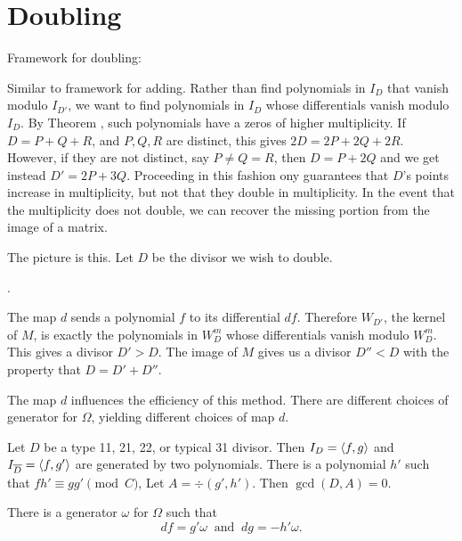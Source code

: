 
\section{Doubling}
\label{chap_doubling}

Framework for doubling:

Similar to framework for adding.
Rather than find polynomials in $I_D$ that vanish modulo $I_{D'}$,
we want to find polynomials in $I_D$ whose differentials vanish modulo $I_D$.
By Theorem , such polynomials have a zeros
of higher multiplicity.
If $D = P + Q + R$, and $P,Q,R$ are distinct, this gives $2D = 2P + 2Q + 2R$.
However, if they are not distinct,
say $P \neq Q = R$, then $D = P + 2Q$ and we get instead $D' = 2P + 3Q$.
Proceeding in this fashion ony guarantees that $D$'s points increase in multiplicity,
but not that they double in multiplicity.
In the event that the multiplicity does not double,
we can recover the missing portion from the image of a matrix.

The picture is this.
Let $D$ be the divisor we wish to double.
\begin{center}
  .
\end{center}
The map $d$ sends a polynomial $f$ to its differential $df$.
Therefore $W_{D'}$, the kernel of $M$, is exactly the polynomials in $W_D^m$ whose
differentials vanish modulo $W_D^m$.
This gives a divisor $D' > D$.
The image of $M$ gives us a divisor $D'' < D$ with the property that $D = D' + D''$.

The map $d$ influences the efficiency of this method.
There are different choices of generator for $\Omega$,
yielding different choices of map $d$.

Let $D$ be a type 11, 21, 22, or typical 31 divisor.
Then $I_D = \left\langle f, g \right\rangle$ and $I_{\overline D} = \left\langle f, g' \right\rangle$ are generated by two polynomials.
There is a polynomial $h'$ such that $fh' \equiv gg' \pmod C$,
Let $A = \div(g', h')$.
Then $\gcd(D, A) = 0$.

There is a generator $\omega$ for $\Omega$ such that
\[ df = g'\omega ~\text{ and }~ dg = -h'\omega. \]

